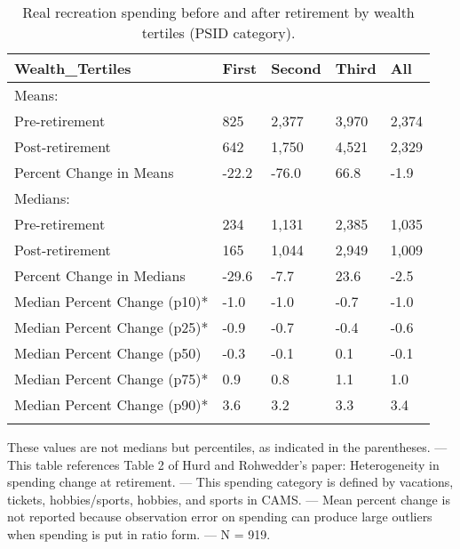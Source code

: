 \begin{table}[tbp] \centering
{}

\caption{Real recreation spending before and after retirement by wealth tertiles (PSID category).}
\begin{tabularx}{\textwidth}{lCCCC}

\toprule
{Wealth\_Tertiles}&{First}&{Second}&{Third}&{All} \tabularnewline
\midrule\addlinespace[1.5ex]
Means:&&&& \tabularnewline
\midrule Pre-retirement&825&2,377&3,970&2,374 \tabularnewline
Post-retirement&642&1,750&4,521&2,329 \tabularnewline
Percent Change in Means&-22.2&-76.0&66.8&-1.9 \tabularnewline
\midrule Medians:&&&& \tabularnewline
\midrule Pre-retirement&234&1,131&2,385&1,035 \tabularnewline
Post-retirement&165&1,044&2,949&1,009 \tabularnewline
Percent Change in Medians&-29.6&-7.7&23.6&-2.5 \tabularnewline
Median Percent Change (p10)*&-1.0&-1.0&-0.7&-1.0 \tabularnewline
Median Percent Change (p25)*&-0.9&-0.7&-0.4&-0.6 \tabularnewline
Median Percent Change (p50)&-0.3&-0.1&0.1&-0.1 \tabularnewline
Median Percent Change (p75)*&0.9&0.8&1.1&1.0 \tabularnewline
Median Percent Change (p90)*&3.6&3.2&3.3&3.4 \tabularnewline
\bottomrule \addlinespace[1.5ex]

\end{tabularx}
\begin{flushleft}
\footnotesize *These values are not medians but percentiles, as indicated in the parentheses. \linebreak --- \linebreak This table references Table 2 of Hurd and Rohwedder's paper: Heterogeneity in spending change at retirement. \linebreak --- \linebreak This spending category is defined by vacations, tickets, hobbies/sports, hobbies, and sports in CAMS. \linebreak --- \linebreak Mean percent change is not reported because observation error on spending can produce large outliers when spending is put in ratio form. \linebreak --- \linebreak N = 919.
\end{flushleft}
\end{table}
